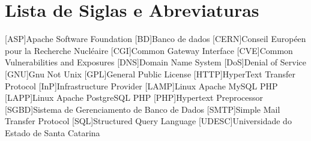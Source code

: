\chapter*{Lista de Siglas e Abreviaturas}
\begin{acronym}

[ASP]{Apache Software Foundation}
[BD]{Banco de dados}
[CERN]{Conseil Europ\'een pour la Recherche Nucl\'eaire}
[CGI]{Common Gateway Interface}
[CVE]{Common Vulnerabilities and Exposures}
[DNS]{Domain Name System}
[DoS]{Denial of Service}
[GNU]{Gnu Not Unix}
[GPL]{General Public License}
[HTTP]{HyperText Transfer Protocol}
[InP]{Infrastructure Provider}
[LAMP]{Linux Apache MySQL PHP}
[LAPP]{Linux Apache PostgreSQL PHP}
[PHP]{Hypertext Preprocessor}
[SGBD]{Sistema de Gerenciamento de Banco de Dados}
[SMTP]{Simple Mail Transfer Protocol}
[SQL]{Structured Query Language}
[UDESC]{Universidade do Estado de Santa Catarina}
\begin{comment}
\acro{CLI}[CLI]{Command Line Interface}
\acro{CPU}[CPU]{Central Processing Unit}
\acro{DPCF}[DPCF]{Data Plane Control Function}
\acro{IETF}[IETF]{Internet Engineering Task Force}
\acro{IO}[I/O]{Input/Output}
\acro{LSD}[LSD]{Link State Database}
\acro{NFS}[NFS]{Network File System}
\acro{ONF}[ONF]{Open Networking Fundation}
\acro{OSPF}[OSPF]{Open Shortest Path First}
\acro{PRNG}[PRNG]{Pseudo-Random Number Generator}
\acro{QOS}[QOS]{Quality of Service}
\acro{RAM}[RAM]{Random Access Memory}
\acro{SDN}[SDN]{Software Defined Network}
\acro{SNMP}[SNMP]{Simple Network Management Protocol}
\end{comment}

\end{acronym}
